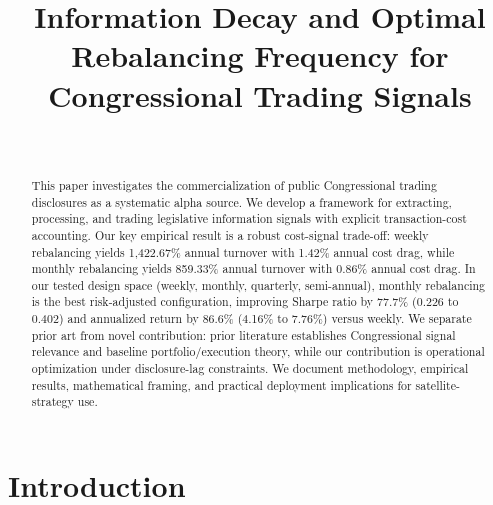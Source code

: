 \documentclass[twocolumn,ieee]{Base_Latex_Template/arithmaxresearch}
\begin{document}
\title{Information Decay and Optimal Rebalancing Frequency for Congressional Trading Signals}

\author{%
\\
%
}

\maketitle
\begin{center}
\vspace{-1em}
\arithmaxtitlelogo[4cm]
\vspace{0.5em}
\end{center}

\begin{abstract}
This paper investigates the commercialization of public Congressional trading disclosures as a systematic alpha source. We develop a framework for extracting, processing, and trading legislative information signals with explicit transaction-cost accounting. Our key empirical result is a robust cost-signal trade-off: weekly rebalancing yields 1,422.67\% annual turnover with 1.42\% annual cost drag, while monthly rebalancing yields 859.33\% annual turnover with 0.86\% annual cost drag. In our tested design space (weekly, monthly, quarterly, semi-annual), monthly rebalancing is the best risk-adjusted configuration, improving Sharpe ratio by 77.7\% (0.226 to 0.402) and annualized return by 86.6\% (4.16\% to 7.76\%) versus weekly. We separate prior art from novel contribution: prior literature establishes Congressional signal relevance and baseline portfolio/execution theory, while our contribution is operational optimization under disclosure-lag constraints. We document methodology, empirical results, mathematical framing, and practical deployment implications for satellite-strategy use.
\end{abstract}

\section{Introduction}
\end{document}
